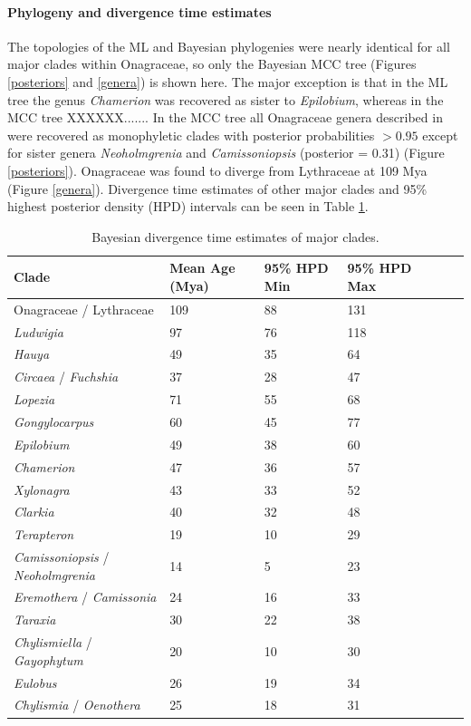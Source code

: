 \documentclass[review]{elsarticle}
\begin{document}
\paragraph{Phylogeny and divergence time estimates}
The topologies of the ML and Bayesian phylogenies were nearly identical for all major clades within Onagraceae, 
so only the Bayesian MCC tree (Figures \ref{posteriors} and \ref{genera}) is shown here.
The major exception is that in the ML tree the genus \textit{Chamerion} was recovered
as sister to \textit{Epilobium}, whereas in the MCC tree XXXXXX.......
In the MCC tree all Onagraceae genera described in \citet{wagner2007revised} were recovered as monophyletic clades with posterior probabilities $> 0.95$
except for sister genera \textit{Neoholmgrenia} and \textit{Camissoniopsis} (posterior = 0.31) (Figure \ref{posteriors}).
Onagraceae was found to diverge from Lythraceae at 109 Mya (Figure \ref{genera}). 
Divergence time estimates of other major clades and 95\% highest posterior density (HPD) intervals can be seen in Table \ref{times}.

\begin{table}
   \center
   \begin{adjustbox}{max width=\textwidth}
      \begin{tabular}{lllllll}
         \toprule
         Clade & Mean Age (Mya) & 95\% HPD Min & 95\% HPD Max \\ 
	 \midrule
         Onagraceae / Lythraceae & 109 & 88 & 131 \\
         \textit{Ludwigia} & 97 & 76 & 118 \\
	 \textit{Hauya} & 49 & 35 & 64 \\
	 \textit{Circaea} / \textit{Fuchshia} & 37 & 28 & 47 \\
	 \textit{Lopezia} & 71 & 55 & 68 \\
	 \textit{Gongylocarpus} & 60 & 45 & 77 \\
	 \textit{Epilobium} & 49 & 38 & 60 \\
	 \textit{Chamerion} & 47 & 36 & 57 \\
	 \textit{Xylonagra} & 43 & 33 & 52 \\
	 \textit{Clarkia} & 40 & 32 & 48 \\
         \textit{Terapteron} & 19 & 10 & 29 \\
	 \textit{Camissoniopsis} / \textit{Neoholmgrenia} & 14 & 5 & 23 \\
	 \textit{Eremothera} / \textit{Camissonia} & 24 & 16 & 33 \\
	 \textit{Taraxia} & 30 & 22 & 38 \\
	 \textit{Chylismiella} / \textit{Gayophytum} & 20 & 10 & 30 \\
	 \textit{Eulobus} & 26 & 19 & 34 \\
	 \textit{Chylismia} / \textit{Oenothera} & 25 & 18 & 31 \\
         \bottomrule
      \end{tabular}
   \end{adjustbox}
   \caption{Bayesian divergence time estimates of major clades.}
   \label{times}
\end{table}
\end{document}
